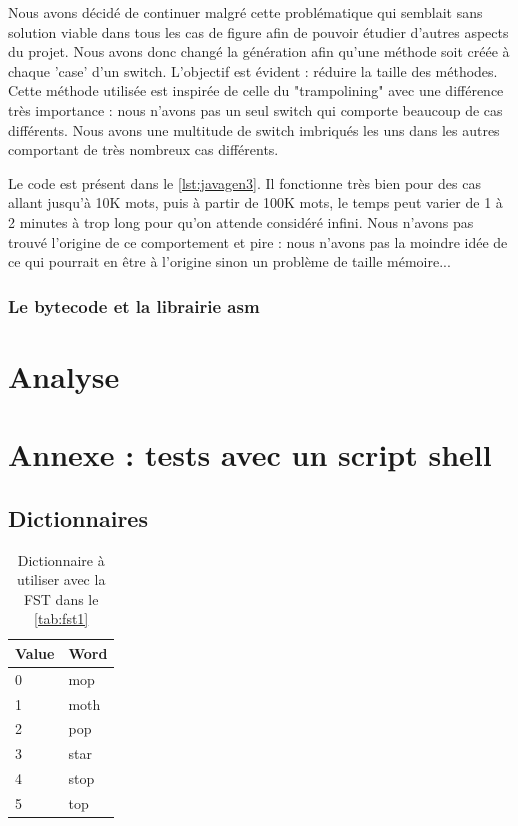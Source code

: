 Nous avons décidé de continuer malgré cette problématique qui semblait sans solution viable
dans tous les cas de figure afin de pouvoir étudier d'autres aspects du projet. Nous avons
donc changé la génération afin qu'une méthode soit créée à chaque 'case' d'un switch.
L'objectif est évident : réduire la taille des méthodes. Cette méthode utilisée est inspirée
de celle du "trampolining" avec une différence très importance : nous n'avons pas un seul
switch qui comporte beaucoup de cas différents. Nous avons une multitude de switch imbriqués
les uns dans les autres comportant de très nombreux cas différents.


Le code est présent dans le \autoref{lst:javagen3}. Il fonctionne très bien pour des cas
allant jusqu'à 10K mots, puis à partir de 100K mots, le temps peut varier de 1 à 2 minutes
à trop long pour qu'on attende considéré infini. Nous n'avons pas trouvé l'origine de ce
comportement et pire : nous n'avons pas la moindre idée de ce qui pourrait en être à
l'origine sinon un problème de taille mémoire...

\subsubsection{Le bytecode et la librairie asm}

\newpage
\section{Analyse}

\newpage
\appendix
\section{Annexe : tests avec un script shell}
\label{sec:annexe:shell}

\subsection{Dictionnaires}

\begin{table}[h]
    \centering
    \begin{tabular}{|l|l|}
        \hline
        Value & Word \\
        \hline
        0 & mop \\
        1 & moth \\
        2 & pop \\
        3 & star \\
        4 & stop \\
        5 & top \\
        \hline
    \end{tabular}
    \caption{Dictionnaire à utiliser avec la FST dans le \autoref{tab:fst1}}
    \label{tab:dico1}
\end{table}

